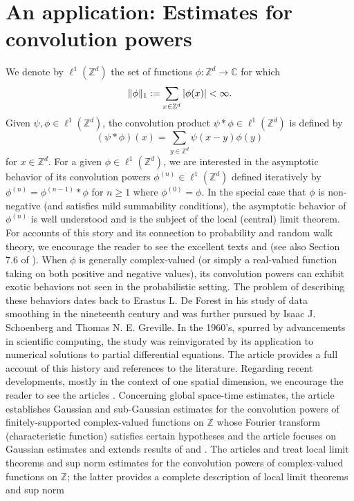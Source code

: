\documentclass[11pt]{article}
\theoremstyle{remark}
\begin{document}
\section{An application: Estimates for convolution powers}\label{sec:ConvolutionPowers}

We denote by $\ell^1(\mathbb{Z}^d)$ the set of functions $\phi:\mathbb{Z}^d\to\mathbb{C}$ for which
\begin{equation*}
\|\phi\|_1:=\sum_{x\in\mathbb{Z}^d}\abs{\phi(x)}<\infty.
\end{equation*}
Given $\psi,\phi\in \ell^1(\mathbb{Z}^d)$, the convolution product $\psi\ast\phi\in\ell^1(\mathbb{Z}^d)$ is defined by
\begin{equation*}
\left(\psi\ast\phi\right)(x)=\sum_{y\in\mathbb{Z}^d}\psi(x-y)\phi(y)
\end{equation*}
for $x\in\mathbb{Z}^d$. For a given $\phi\in\ell^1(\mathbb{Z}^d)$, we are interested in the asymptotic behavior of its convolution powers $\phi^{(n)}\in\ell^1(\mathbb{Z}^d)$ defined iteratively by $\phi^{(n)}=\phi^{(n-1)}\ast\phi$ for $n\geq 1$ where $\phi^{(0)}=\phi$. In the special case that $\phi$ is non-negative (and satisfies mild summability conditions), the asymptotic behavior of $\phi^{(n)}$ is well understood and is the subject of the local (central) limit theorem. For accounts of this story and its connection to probability and random walk theory, we encourage the reader to see the excellent texts \cite{lawler_random_2010} and \cite{spitzer_principles_1964} (see also Section 7.6 of \cite{randles_convolution_2017}). When $\phi$ is generally complex-valued (or simply a real-valued function taking on both positive and negative values), its convolution powers can exhibit exotic behaviors not seen in the probabilistic setting. The problem of describing these behaviors dates back to Erastus L. De Forest in his study of data smoothing in the nineteenth century and was further pursued by Isaac J. Schoenberg and Thomas N. E.  Greville. In the 1960's, spurred by advancements in scientific computing, the study was reinvigorated by its application to numerical solutions to partial differential equations. The article \cite{diaconis_convolution_2014} provides a full account of this history and references to the literature. Regarding recent developments, mostly in the context of one spatial dimension, we encourage the reader to see the articles \cite{diaconis_convolution_2014,randles_convolution_2015, coulombel2020generalized, randles_convolution_2017}. Concerning global space-time estimates, the article \cite{diaconis_convolution_2014} establishes Gaussian and sub-Gaussian estimates for the convolution powers of finitely-supported complex-valued functions on $\mathbb{Z}$ whose Fourier transform (characteristic function) satisfies certain hypotheses and the article \cite{coulombel2020generalized} focuses on Gaussian estimates and extends results of \cite{diaconis_convolution_2014} and \cite{randles_convolution_2017}. The articles \cite{diaconis_convolution_2014} and \cite{randles_convolution_2015} treat local limit theorems and sup norm estimates for the convolution powers of complex-valued functions on $\mathbb{Z}$; the latter provides a complete description of local limit theorems and sup norm 
\end{document}
